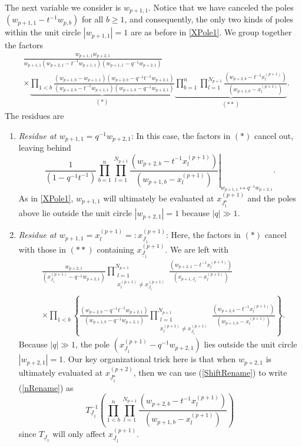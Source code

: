 \documentclass{amsart}
\renewcommand{\triangle}{\vartriangle}
\newcommand{\Ju}{{\underline{J}}}
\theoremstyle{remark}
\numberwithin{thm}{section}
\numberwithin{equation}{section}
\begin{document}
The next variable we consider is $w_{p+1,1}$.
Notice that we have canceled the poles $\left( w_{p+1,1}-t^{-1}w_{p,b} \right)$ for all $b\ge 1$, and consequently, the only two kinds of poles within the unit circle $|w_{p+1,1}|=1$ are as before in \ref{XPole1}.
We group together the factors
\begin{align*}
&\frac{w_{p+1,1}w_{p+2,1}}
{w_{p+1,1}\left( w_{p+2,1}-t^{-1}w_{p+1,1} \right)\left( w_{p+1,1}-q^{-1}w_{p+2,1} \right)}\\
&\times
\underbrace{\prod_{1<b}
\frac{ \left( w_{p+1,b}-w_{p+1,1} \right)\left(w_{p+2,b}-q^{-1}t^{-1}w_{p+2,1} \right)}
{\left( w_{p+2,b}-t^{-1}w_{p+1,1} \right)\left( w_{p+1,b}-q^{-1}w_{p+2,1} \right)}}_{(*)}
\underbrace{\prod_{b=1}^n\prod_{l=1}^{N_{p+1}}
\frac{\left( w_{p+2,b}-t^{-1}x_{l}^{(p+1)} \right)}
{\left( w_{p+1,b}-x_{l}^{(p+1)} \right)}}_{(**)}.
\end{align*}
The residues are
\begin{enumerate}
\item \textit{Residue at $w_{p+1,1}=q^{-1}w_{p+2,1}$}:
In this case, the factors in $(*)$ cancel out, leaving behind
\[
\frac{1}{(1-q^{-1}t^{-1})}
\left.\prod_{b=1}^n\prod_{l=1}^{N_{p+1}}
\frac{\left( w_{p+2,b}-t^{-1}x_{l}^{(p+1)} \right)}
{\left( w_{p+1,b}-x_{l}^{(p+1)} \right)}\right|_{w_{p+1,1}\mapsto q^{-1}w_{p+2,1}}.
\]
As in \ref{XPole1}, $w_{p+1,1}$ will ultimately be evaluated at $x^{(p+1)}_{\Ju_1^\triangle}$ and the poles above lie outside the unit circle $|w_{p+2,1}|=1$ because $|q|\gg1$.
\item \textit{Residue at $w_{p+1,1}=x_{l}^{(p+1)}=:x^{(p+1)}_{\Ju_1}$}:
Here, the factors in $(*)$ cancel with those in $(**)$ containing $x^{(p+1)}_{\Ju_1}$.
We are left with
\begin{align}
\nonumber&\frac{w_{p+2,1}}{\left( x^{(p+1)}_{\Ju_1}-q^{-1}w_{p+2,1} \right)}
\prod_{\substack{l=1\\x^{(p+1)}_{l}\not=x^{(p+1)}_{\Ju_1}}}^{N_{p+1}}
\frac{\left( w_{p+2,1}-t^{-1}x^{(p+1)}_{l} \right)}
{\left( x_{p+1,\Ju_1}-x^{(p+1)}_{l} \right)}\\
\label{nRename}
&\times\prod_{1<b}
\left\{\frac{\left( w_{p+2,b}-q^{-1}t^{-1}w_{p+2,1} \right)}
{\left( w_{p+1,b}-q^{-1}w_{p+2,1} \right)}
\prod_{\substack{l=1\\x^{(p+1)}_{l}\not=x^{(p+1)}_{\Ju_1}}}^{N_{p+1}}
\frac{\left( w_{p+2,b}-t^{-1}x^{(p+1)}_{l} \right)}
{\left(w_{p+1,b}-x^{(p+1)}_{l}\right)}\right\}.
\end{align}
Because $|q|\gg 1$, the pole $\left( x^{(p+1)}_{\Ju_1}-q^{-1}w_{p+2,1} \right)$ lies outside the unit circle $|w_{p+2,1}|=1$.
Our key organizational trick here is that when $w_{p+2,1}$ is ultimately evaluated at $x^{(p+2)}_{\Ju_1^\triangle}$, then we can use (\ref{ShiftRename}) to write (\ref{nRename}) as
\[
T_{\Ju_1}^{-1}\left(
\prod_{1<b}^n\prod_{l=1}^{N_{p+1}}
\frac{\left( w_{p+2,b}-t^{-1}x^{(p+1)}_{l} \right)}
{\left( w_{p+1,b}-x^{(p+1)}_{l} \right)}
\right)
\]
since $T_{\Ju_1}$ will only affect $x^{(p+1)}_{\Ju_1}$.
\end{enumerate}
\end{document}
